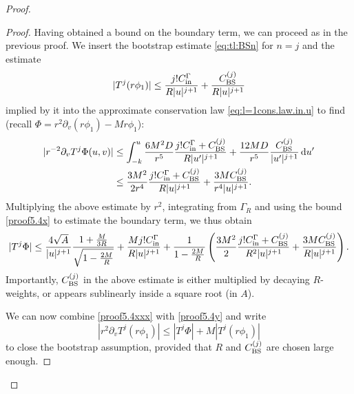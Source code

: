 \documentclass[11pt,english]{article}
\numberwithin{equation}{section}
\theoremstyle{remark}
\theoremstyle{plain}
\theoremstyle{remark}
\newcommand{\dd}{\mathop{}\!\mathrm{d}}
\newcommand{\pv}{\partial_v}
\renewcommand{\(}{\left(}
\renewcommand{\)}{\right)}
\newcommand{\pho}{(r\phi_1)}
\begin{document}
\begin{proof}
\begin{proof}
Having obtained a bound on the boundary term, we can proceed as in the previous proof. We  insert the bootstrap estimate \eqref{eq:tl:BSn} for $n=j$ and the estimate 
\begin{equation}\label{proof5.4y}
 |T^j(r\phi_1)|\leq \frac{j!C_{\mathrm{in}}^\Gamma}{R|u|^{j+1}}+\frac{C_{\mathrm{BS}}^{(j)}}{R|u|^{j+1}}
\end{equation}
implied by it into the approximate conservation law \eqref{eq:l=1cons.law.in.u} to find (recall $\Phi=r^2\pv\pho-Mr\phi_1$):
\begin{align}\label{proof5.4xx}
\begin{split}
|r^{-2}\pv T^j\Phi(u,v)|&\leq \int_{-k}^{u} \frac{6M^2D}{r^5}\frac{j!\cin+\cbs^{(j)}}{R|u'|^{j+1}}+\frac{12MD}{r^5}\frac{\cbs^{(j)}}{|u'|^{j+1}}\dd u'\\
&\leq \frac{3M^2}{2r^4}\frac{j!\cin+\cbs^{(j)}}{R|u|^{j+1}}+\frac{3M\cbs^{(j)}}{r^4|u|^{j+1}}.
\end{split}
\end{align}
Multiplying the above estimate by $r^2$, integrating  from $\Gamma_R$ and using the bound \eqref{proof5.4x} to estimate the boundary term, we thus obtain
\begin{align}\label{proof5.4xxx}
\begin{split}
|T^j\Phi|\leq \frac{4\sqrt{A}}{|u|^{j+1}}\frac{1+\frac{M}{3R}}{\sqrt{1-\frac{2M}{R}}}+\frac{Mj!C_{\mathrm{in}}^\Gamma}{R|u|^{j+1}}+\frac{1}{1-\frac{2M}{R}}\left(\frac{3M^2}{2}\frac{j!C_{\mathrm{in}}^\Gamma+C_{\mathrm{BS}}^{(j)}}{R^2|u|^{j+1}}+\frac{3MC_{\mathrm{BS}}^{(j)}}{R|u|^{j+1}}\right).
\end{split}
\end{align}
Importantly, $C_{\mathrm{BS}}^{(j)}$ in the above estimate is either multiplied by decaying $R$-weights, or appears sublinearly inside a square root (in $A$).

We can now combine \eqref{proof5.4xxx} with \eqref{proof5.4y} and write
\begin{equation}
|r^2\pv T^j\pho|\leq |T^j\Phi|+M|T^j\pho|
\end{equation}
to close the bootstrap assumption, provided that $R$ and $C_{\mathrm{BS}}^{(j)}$ are chosen large enough.
\end{proof}


\end{proof}
\end{document}
